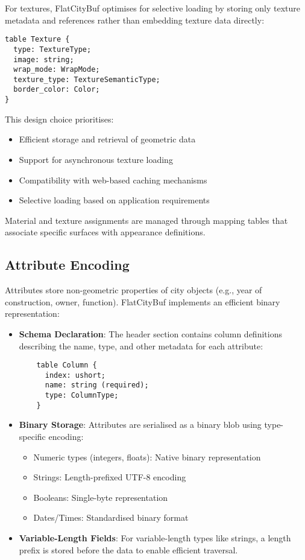 For textures, FlatCityBuf optimises for selective loading by storing only texture metadata and references rather than embedding texture data directly:

\begin{verbatim}
table Texture {
  type: TextureType;
  image: string;
  wrap_mode: WrapMode;
  texture_type: TextureSemanticType;
  border_color: Color;
}
\end{verbatim}

This design choice prioritises:
\begin{itemize}
    \item Efficient storage and retrieval of geometric data
    \item Support for asynchronous texture loading
    \item Compatibility with web-based caching mechanisms
    \item Selective loading based on application requirements
\end{itemize}

Material and texture assignments are managed through mapping tables that associate specific surfaces with appearance definitions.

\subsection{Attribute Encoding}
\label{subsec:attribute_encoding}

Attributes store non-geometric properties of city objects (e.g., year of construction, owner, function). FlatCityBuf implements an efficient binary representation:

\begin{itemize}
    \item \textbf{Schema Declaration}: The header section contains column definitions describing the name, type, and other metadata for each attribute:

    \begin{verbatim}
    table Column {
      index: ushort;
      name: string (required);
      type: ColumnType;
    }
    \end{verbatim}

    \item \textbf{Binary Storage}: Attributes are serialised as a binary blob using type-specific encoding:
    \begin{itemize}
        \item Numeric types (integers, floats): Native binary representation
        \item Strings: Length-prefixed UTF-8 encoding
        \item Booleans: Single-byte representation
        \item Dates/Times: Standardised binary format
    \end{itemize}

    \item \textbf{Variable-Length Fields}: For variable-length types like strings, a length prefix is stored before the data to enable efficient traversal.
\end{itemize}

